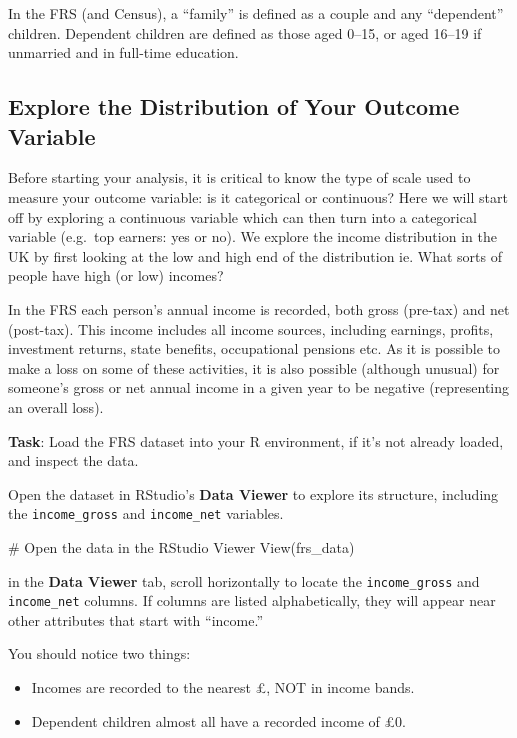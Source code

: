 \documentclass[
  letterpaper,
  DIV=11,
  numbers=noendperiod]{scrreprt}
\newenvironment{Shaded}{\begin{snugshade}}{\end{snugshade}}
\newcommand{\CommentTok}[1]{\textcolor[rgb]{0.37,0.37,0.37}{#1}}
\newcommand{\FunctionTok}[1]{\textcolor[rgb]{0.28,0.35,0.67}{#1}}
\newcommand{\NormalTok}[1]{\textcolor[rgb]{0.00,0.23,0.31}{#1}}
\providecommand{\tightlist}{%
  \setlength{\itemsep}{0pt}\setlength{\parskip}{0pt}}
\begin{document}
In the FRS (and Census), a ``family'' is defined as a couple and any
``dependent'' children. Dependent children are defined as those aged
0--15, or aged 16--19 if unmarried and in full-time education.

\subsection{Explore the Distribution of Your Outcome
Variable}\label{explore-the-distribution-of-your-outcome-variable}

Before starting your analysis, it is critical to know the type of scale
used to measure your outcome variable: is it categorical or continuous?
Here we will start off by exploring a continuous variable which can then
turn into a categorical variable (e.g.~top earners: yes or no). We
explore the income distribution in the UK by first looking at the low
and high end of the distribution ie. What sorts of people have high (or
low) incomes?

In the FRS each person's annual income is recorded, both gross (pre-tax)
and net (post-tax). This income includes all income sources, including
earnings, profits, investment returns, state benefits, occupational
pensions etc. As it is possible to make a loss on some of these
activities, it is also possible (although unusual) for someone's gross
or net annual income in a given year to be negative (representing an
overall loss).

\textbf{Task}: Load the FRS dataset into your R environment, if it's not
already loaded, and inspect the data.

Open the dataset in RStudio's \textbf{Data Viewer} to explore its
structure, including the \texttt{income\_gross} and \texttt{income\_net}
variables.

\begin{Shaded}
\begin{Highlighting}[]
 \CommentTok{\# Open the data in the RStudio Viewer}
\FunctionTok{View}\NormalTok{(frs\_data)}
\end{Highlighting}
\end{Shaded}

in the \textbf{Data Viewer} tab, scroll horizontally to locate the
\texttt{income\_gross} and \texttt{income\_net} columns. If columns are
listed alphabetically, they will appear near other attributes that start
with ``income.''

You should notice two things:

\begin{itemize}
\tightlist
\item
  Incomes are recorded to the nearest £, NOT in income bands.
\item
  Dependent children almost all have a recorded income of £0.
\end{itemize}
\end{document}
